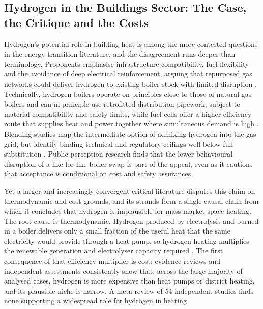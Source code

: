 \subsection{Hydrogen in the Buildings Sector: The Case, the Critique and the Costs}
\label{sec:lit:h2}

Hydrogen's potential role in building heat is among the more contested questions
in the energy-transition literature, and the disagreement runs deeper than terminology. Proponents emphasise infrastructure compatibility, fuel
flexibility and the avoidance of deep electrical reinforcement, arguing that
repurposed gas networks could deliver hydrogen to existing boiler stock with
limited disruption \citep{Dodds2015,Bothe2021}. Technically, hydrogen boilers operate on
principles close to those of natural-gas boilers and can in principle use
retrofitted distribution pipework, subject to material compatibility and safety
limits, while fuel cells offer a higher-efficiency route that supplies heat and
power together where simultaneous demand is high \citep{IEAHydrogenReview2022,Scita2020}. Blending studies
map the intermediate option of admixing hydrogen into the gas grid, but identify
binding technical and regulatory ceilings well below full substitution
\citep{Erdener2022Review,Giehl2023}. Public-perception research
finds that the lower behavioural disruption of a like-for-like boiler swap is part
of the appeal, even as it cautions that acceptance is conditional on cost and
safety assurances \citep{Thomas2023Hydrogen, Gordon2023Divergent}.

Yet a larger and increasingly convergent critical literature disputes this claim on
thermodynamic and cost grounds, and its strands form a single causal chain from which it
concludes that hydrogen is implausible for mass-market space heating. The root cause is
thermodynamic. Hydrogen produced by electrolysis and burned in a boiler delivers only a
small fraction of the useful heat that the same electricity would provide through a heat
pump, so hydrogen heating multiplies the renewable generation and electrolyser capacity
required \citep{Cebon2022,Rosenow2022PipeDream}. The first consequence of that
efficiency multiplier is cost; evidence reviews and independent assessments consistently
show that, across the large majority of analysed cases, hydrogen is more expensive than heat pumps or district heating, and its plausible niche is narrow. A meta-review of 54 independent studies finds none supporting a widespread role for hydrogen in heating \citep{Rosenow2024MetaReview,Rosenow2022PipeDream,Rosenow2020Pathway}.

